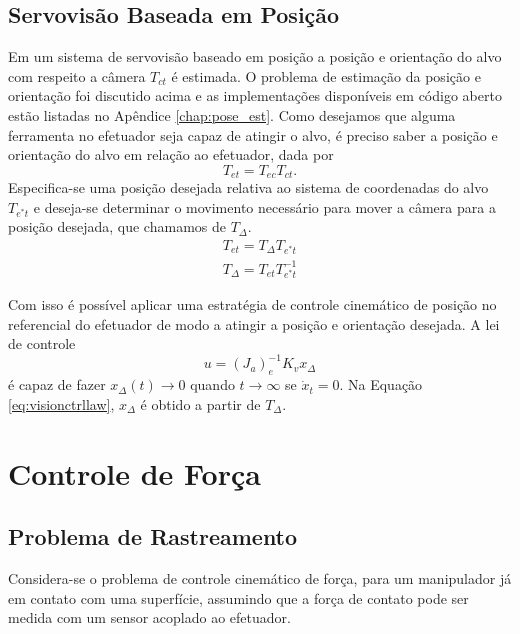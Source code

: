
\subsection{Servovisão Baseada em Posição}
Em um sistema de servovisão baseado em posição a posição e orientação do alvo com respeito a câmera ${T}_{ct}$ é estimada. O problema de estimação da posição e orientação foi discutido acima e as implementações disponíveis em código aberto estão listadas no Apêndice \ref{chap:pose_est}. Como desejamos que alguma ferramenta no efetuador seja capaz de atingir o alvo, é preciso saber a posição e orientação do alvo em relação ao efetuador, dada por
\begin{equation}
T_{et} = T_{ec} T_{ct}.
\end{equation} 
Especifica-se uma posição desejada relativa ao sistema de coordenadas do alvo  ${T}_{e^*t}$ e deseja-se determinar o movimento necessário para mover a câmera para a posição desejada, que chamamos de ${T}_\Delta$.
\begin{align}
 {T}_{et} =  {T}_\Delta {T}_{e^*t} \\
 {T}_\Delta  =   {T}_{et} {T}_{e^*t}^{-1}
\end{align}

Com isso é possível aplicar uma estratégia de controle cinemático de posição no referencial do efetuador de modo a atingir a posição e orientação desejada. A lei de controle
\begin{equation} \label{eq:visionctrllaw}
{u} = ({J}_a)_e^{-1}{K}_v x_\Delta
\end{equation}
é capaz de fazer ${x_\Delta}(t) \rightarrow 0$ quando $t \rightarrow \infty$ se $\dot{{x}}_t = 0$. Na Equação \eqref{eq:visionctrllaw}, $x_\Delta$ é obtido a partir de $T_\Delta$.


\section{Controle de Força}
\subsection{Problema de Rastreamento}
Considera-se o problema de controle cinemático de força, para um manipulador já em contato com uma superfície, assumindo que a força de contato pode ser medida com um sensor acoplado ao efetuador. 

